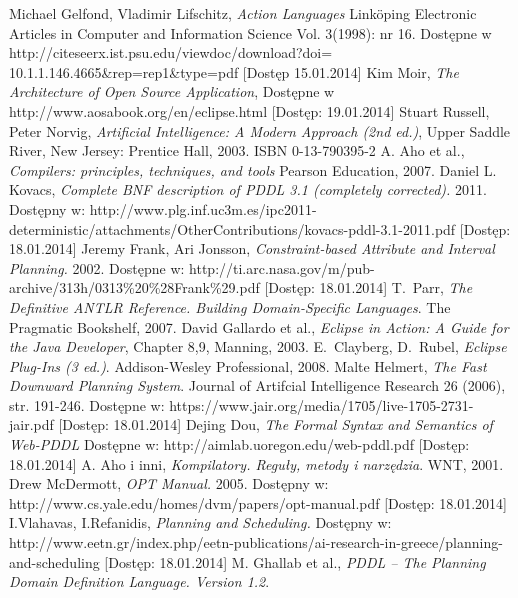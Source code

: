 
\begin{thebibliography}{1}


 Michael Gelfond, Vladimir Lifschitz, \emph{Action Languages} Linköping Electronic Articles in
Computer and Information Science
Vol. 3(1998): nr 16. Dostępne w http://citeseerx.ist.psu.edu/viewdoc/download?doi= 10.1.1.146.4665\&{}rep=rep1\&{}type=pdf [Dostęp 15.01.2014]
Kim Moir, \emph{The Architecture of Open Source Application}, Dostępne w http://www.aosabook.org/en/eclipse.html [Dostęp: 19.01.2014]
 Stuart Russell, Peter Norvig, \emph{Artificial Intelligence: A
Modern Approach (2nd ed.)}, Upper Saddle River, New Jersey: Prentice Hall, 2003.
ISBN 0-13-790395-2
A. Aho et al., \emph{Compilers: principles,
techniques, and tools} Pearson Education, 2007.
Daniel L. Kovacs, \emph{Complete BNF description of PDDL 3.1 (completely corrected).} 2011. Dostępny w: http://www.plg.inf.uc3m.es/ipc2011-deterministic/attachments/OtherContributions/kovacs-pddl-3.1-2011.pdf [Dostęp: 18.01.2014]
 Jeremy Frank, Ari Jonsson, \emph{Constraint-based Attribute and Interval Planning.} 2002. Dostępne w:
http://ti.arc.nasa.gov/m/pub-archive/313h/0313\%20\%28Frank\%29.pdf [Dostęp: 18.01.2014] 
T.~Parr, \emph{The Definitive ANTLR Reference. Building Domain-Specific Languages}. 
The Pragmatic Bookshelf, 2007.
 David Gallardo et al., \emph{Eclipse in Action: A Guide for the Java Developer}, Chapter 8,9, Manning, 2003.
E.~Clayberg, D.~Rubel, \emph{Eclipse Plug-Ins (3 ed.)}. Addison-Wesley Professional, 2008. 
 Malte Helmert, \emph{The Fast Downward Planning System}. Journal of Artifcial Intelligence Research 26 (2006), str. 191-246. Dostępne w: https://www.jair.org/media/1705/live-1705-2731-jair.pdf [Dostęp: 18.01.2014]
 Dejing Dou, \emph{The Formal Syntax and Semantics of Web-PDDL} Dostępne w: http://aimlab.uoregon.edu/web-pddl.pdf [Dostęp: 18.01.2014]
A. Aho i inni, \emph{Kompilatory. Reguły, metody i narzędzia}.
WNT, 2001.
 Drew McDermott, \emph{OPT Manual.} 2005. Dostępny w: http://www.cs.yale.edu/homes/dvm/papers/opt-manual.pdf [Dostęp: 18.01.2014]
 I.Vlahavas, I.Refanidis, \emph{Planning and Scheduling.} Dostępny w: http://www.eetn.gr/index.php/eetn-publications/ai-research-in-greece/planning-and-scheduling [Dostęp: 18.01.2014]
M. Ghallab et al., \emph{PDDL -- The Planning Domain Definition Language. Version 1.2}.

\end{thebibliography}
